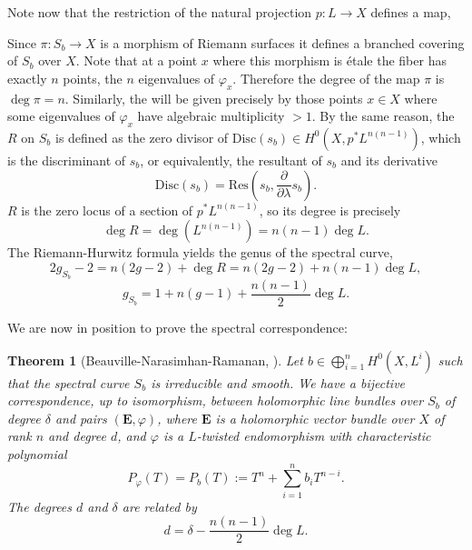 \documentclass[12pt,a4paper]{book}
\newtheorem{thm}{Theorem}[section]
\theoremstyle{definition} \newtheorem{defn}[thm]{Definition}
\theoremstyle{definition} \newtheorem{ejemplo}[thm]{Example}
\theoremstyle{remark} \newtheorem{rem}[thm]{Remark}
\def\Disc{\mathrm{Disc}}
\def\Res{\mathrm{Res}}
\newcommand{\ve}[1]{\mathbf{#1}}
\let\emph\relax
\begin{document}
       Note now that the restriction of the natural projection $p:L\rightarrow X$ defines a map,
       \begin{center}
	\end{center}
	Since $\pi:S_b\rightarrow X$ is a morphism of Riemann surfaces it defines a branched covering of $S_b$ over $X$. Note that at a point $x$ where this morphism is étale the fiber has exactly $n$ points, the $n$ eigenvalues of $\varphi_x$. Therefore the degree of the map $\pi$ is $\deg \pi = n$. Similarly, the \emph{branch locus} will be given precisely by those points $x\in X$ where some eigenvalues of $\varphi_x$ have algebraic multiplicity $>1$. By the same reason, the \emph{ramification divisor} $R$ on $S_b$ is defined as the zero divisor of $\Disc(s_b)\in H^0(X,p^*L^{n(n-1)})$, which is the discriminant of $s_b$, or equivalently, the resultant of $s_b$ and its derivative
	\begin{equation*}
	  \Disc(s_b)=\Res\left(s_b, \frac{\partial}{\partial \lambda} s_b\right).
	\end{equation*}
	$R$ is the zero locus of a section of $p^*L^{n(n-1)}$, so its degree is precisely
	\begin{equation*}
	  \deg R = \deg (L^{n(n-1)})=n(n-1)\deg L.
	\end{equation*}
	The Riemann-Hurwitz formula yields the genus of the spectral curve,
	\begin{equation*}
	  2g_{S_b} - 2 = n(2g-2) + \deg R = n(2g-2) + n(n-1)\deg L,
	\end{equation*}
	\begin{equation*}
	  g_{S_b}= 1+n(g-1)+ \frac{n(n-1)}{2}\deg L.
	\end{equation*}

	We are now in position to prove the spectral correspondence:
	\begin{thm}[Beauville-Narasimhan-Ramanan, \cite{bnr}]
	  Let $b \in \bigoplus_{i=1}^n H^0(X,L^i)$ such that the spectral curve $S_b$ is irreducible and smooth. We have a bijective correspondence, up to isomorphism, between holomorphic line bundles over $S_b$ of degree $\delta$ and pairs $(\ve{E},\varphi)$, where $\ve{E}$ is a holomorphic vector bundle over $X$ of rank $n$ and degree $d$, and $\varphi$ is a $L$-twisted endomorphism with characteristic polynomial
	  \begin{equation*}
	    P_\varphi(T)=P_b(T):=T^n + \sum_{i=1}^n b_i T^{n-i}.   
	  \end{equation*}
	  The degrees $d$ and $\delta$ are related by
	  \begin{equation*}
	    d=\delta - \frac{n(n-1)}{2}\deg L .
	  \end{equation*}
	\end{thm}
\end{document}
